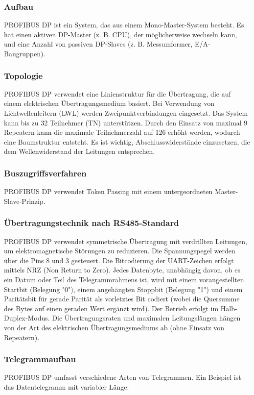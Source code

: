 \documentclass{report}
\begin{document}
\subsubsection{Aufbau}
PROFIBUS DP ist ein System, das aus einem Mono-Master-System besteht. Es hat einen aktiven DP-Master (z. B. CPU), der möglicherweise wechseln kann, und eine Anzahl von passiven DP-Slaves (z. B. Messumformer, E/A-Baugruppen).

\subsubsection{Topologie}
PROFIBUS DP verwendet eine Linienstruktur für die Übertragung, die auf einem elektrischen Übertragungsmedium basiert. Bei Verwendung von Lichtwellenleitern (LWL) werden Zweipunktverbindungen eingesetzt. Das System kann bis zu 32 Teilnehmer (TN) unterstützen. Durch den Einsatz von maximal 9 Repeatern kann die maximale Teilnehmerzahl auf 126 erhöht werden, wodurch eine Baumstruktur entsteht. Es ist wichtig, Abschlusswiderstände einzusetzen, die dem Wellenwiderstand der Leitungen entsprechen.

\subsubsection{Buszugriffsverfahren}
PROFIBUS DP verwendet Token Passing mit einem untergeordneten Master-Slave-Prinzip.

\subsubsection{Übertragungstechnik nach RS485-Standard}
PROFIBUS DP verwendet symmetrische Übertragung mit verdrillten Leitungen, um elektromagnetische Störungen zu reduzieren. Die Spannungspegel werden über die Pins 8 und 3 gesteuert. Die Bitcodierung der UART-Zeichen erfolgt mittels NRZ (Non Return to Zero). Jedes Datenbyte, unabhängig davon, ob es ein Datum oder Teil des Telegrammrahmens ist, wird mit einem vorangestellten Startbit (Belegung "0"), einem angehängten Stoppbit (Belegung "1") und einem Paritätsbit für gerade Parität als vorletztes Bit codiert (wobei die Quersumme des Bytes auf einen geraden Wert ergänzt wird). Der Betrieb erfolgt im Halb-Duplex-Modus. Die Übertragungsraten und maximalen Leitungslängen hängen von der Art des elektrischen Übertragungsmediums ab (ohne Einsatz von Repeatern).

\subsubsection{Telegrammaufbau}
PROFIBUS DP umfasst verschiedene Arten von Telegrammen. Ein Beispiel ist das Datentelegramm mit variabler Länge:
\end{document}
